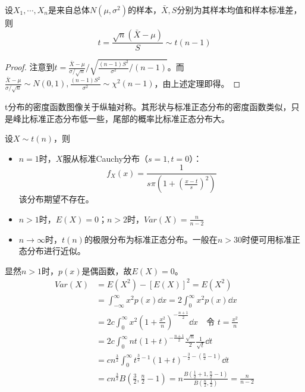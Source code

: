 \documentclass[UTF-8]{ctexbeamer}
\begin{document}
\begin{frame}
  \begin{Thm}
    设$X_{1},\cdots,X_{n}$是来自总体$N(\mu,\sigma^{2})$的样本，$\bar X,S$分别为其样本均值和样本标准差，则
    \[t=\frac{\sqrt{n}(\bar X-\mu)}{S}\sim t(n-1)\]
  \end{Thm}
  \begin{proof}
    注意到$t=\frac{\bar X-\mu}{\sigma/\sqrt{n}}/\sqrt{\frac{(n-1)S^{2}}{\sigma^{2}}/(n-1)}$。而$\frac{\bar X-\mu}{\sigma/\sqrt{n}}\sim N(0,1), \frac{(n-1)S^{2}}{\sigma^{2}}\sim \chi^{2}(n-1)$，由上述定理即得。
  \end{proof}
\end{frame}

\begin{frame}
  t分布的密度函数图像关于纵轴对称。其形状与标准正态分布的密度函数类似，只是峰比标准正态分布低一些，尾部的概率比标准正态分布大。
  \begin{Prop}
    设$X\sim t(n)$，则
    \begin{itemize}
    \item $n=1$时，$X$服从标准Cauchy分布（$s=1,t=0$）：
      \[f_{X}(x)=\frac{1}{s\pi(1+(\frac{x-t}{s})^{2})}\]
      该分布期望不存在。
    \item $n>1$时，$E(X)=0$；$n>2$时，$Var(X)=\frac{n}{n-2}$
      
    \item $n\to\infty$时，$t(n)$的极限分布为标准正态分布。一般在$n>30$时便可用标准正态分布进行近似。
    \end{itemize}
  \end{Prop}
\end{frame}

\begin{frame}
  显然$n>1$时，$p(x)$是偶函数，故$E(X)=0$。
\begin{align*}
  Var(X)&=E(X^{2})-[E(X)]^{2}=E(X^{2})\\
        &=\int_{-\infty}^{\infty}x^{2}p(x)\dd x=2\int_{0}^{\infty}x^{2}p(x)\dd x\\
        &=2c\int_{0}^{\infty}x^{2}(1+\frac{x^{2}}{n})^{-\frac{n+1}{2}}\dd x\quad \text{令 }t=\frac{x^{2}}{n}\\
        &=2c\int_{0}^{\infty}nt(1+t)^{-\frac{n+1}{2}}\frac{\sqrt{n}}{2}\frac{1}{\sqrt{t}}\dd t\\
        &=cn^{\frac{3}{2}}\int_{0}^{\infty}t^{\frac{3}{2}-1}(1+t)^{-\frac{3}{2}-(\frac{n}{2}-1)}\dd t\\
  &=cn^{\frac 3 2}B(\frac{3}{2},\frac{n}{2}-1)=n\frac{B(\frac{1}{2}+1,\frac{n}{2}-1)}{B(\frac{n}{2},\frac{1}{2})}=\frac{n}{n-2}
  \end{align*}
  
\end{frame}
\end{document}
